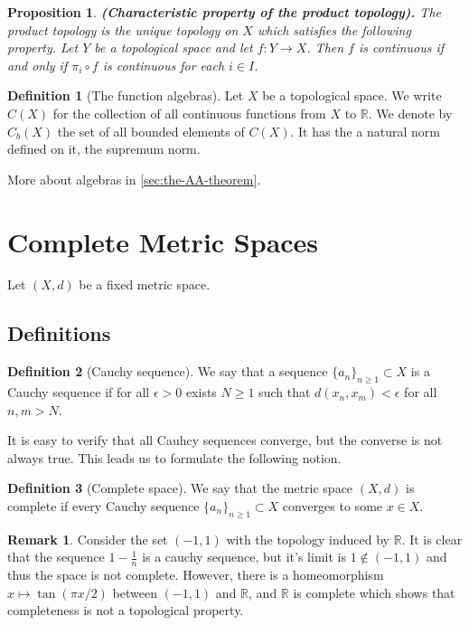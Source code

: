 \documentclass[11pt,a4paper]{article}
\theoremstyle{definition}
\newtheorem{definition}{Definition}[section]
\newtheorem{remark}{Remark}[section]
\theoremstyle{plain}
\newtheorem{proposition}[theorem]{Proposition}
\newcommand{\R}{\mathbb{R}}
\renewcommand{\tt}[1]{\textnormal{\textbf{(#1).}}} %
\begin{document}
  \begin{proposition}
    \tt{Characteristic property of the product topology}
    The product topology is the unique topology on $X$ which satisfies the 
    following property. Let $Y$ be a topological space and let 
    $f \colon Y \to X$. Then $f$ is continuous if and only if 
    $\pi_i \circ f$ is continuous for each $i \in I$.
  \end{proposition}

  \begin{definition}[The function algebras]
    Let $X$ be a topological space. We write $C(X)$ for the collection of 
    all continuous functions from $X$ to $\R$. We denote by $C_b(X)$ the set 
    of all bounded elements of $C(X)$. It has the a natural norm defined on
    it, the supremum norm.
  \end{definition}

  More about algebras in \autoref{sec:the-AA-theorem}.

  \newpage

  \section{Complete Metric Spaces}\label{sec:complete-metric-spaces}
  Let $(X,d)$ be a fixed metric space.

  \subsection{Definitions}

  \begin{definition}[Cauchy sequence]
    We say that a sequence $\{a_n\}_{n \geq 1} \subset X$ is a Cauchy
    sequence if for all $\epsilon > 0$ exists $N \geq 1$ such that 
    $d(x_n,x_m) < \epsilon$ for all $n,m > N$.
  \end{definition}

  It is easy to verify that all Cauhcy sequences converge, but the converse
  is not always true. This leads us to formulate the following notion.

  \begin{definition}[Complete space]
    We say that the metric space $(X,d)$ is complete if every Cauchy
    sequence $\{a_n\}_{n \geq 1} \subset X$ converges to some $x \in X$.
  \end{definition}

  \begin{remark}
    Consider the set $(-1,1)$ with the topology induced by $\R$. It is
    clear that the sequence $1 - \frac{1}{n}$ is a cauchy sequence, but
    it's limit is $1 \notin (-1,1)$ and thus the space is not complete.
    However, there is a homeomorphism $x \mapsto \tan(\pi x/2)$ between
    $(-1,1)$ and $\R$, and $\R$ is complete which shows that completeness
    is not a topological property.
  \end{remark}
\end{document}
